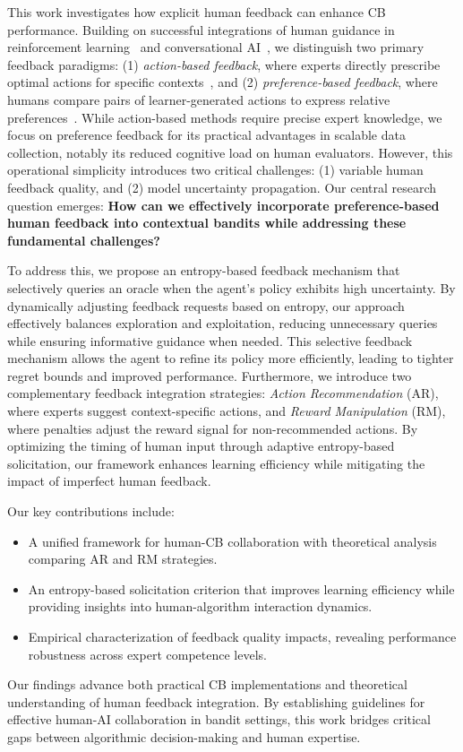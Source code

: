 This work investigates how explicit human feedback can enhance CB performance. Building on successful integrations of human guidance in reinforcement learning~\citep{christiano2017deep,macglashan2017interactive} and conversational AI~\citep{achiam2023gpt}, we distinguish two primary feedback paradigms: (1) \emph{action-based feedback}, where experts directly prescribe optimal actions for specific contexts~\citep{osa2018algorithmic,li2023reinforcement}, and (2) \emph{preference-based feedback}, where humans compare pairs of learner-generated actions to express relative preferences~\citep{christiano2017deep,saha2023dueling}. While action-based methods require precise expert knowledge, we focus on preference feedback for its practical advantages in scalable data collection, notably its reduced cognitive load on human evaluators. However, this operational simplicity introduces two critical challenges: (1) variable human feedback quality, and (2) model uncertainty propagation. Our central research question emerges: \textbf{How can we effectively incorporate preference-based human feedback into contextual bandits while addressing these fundamental challenges?}

To address this, we propose an entropy-based feedback mechanism that selectively queries an oracle when the agent’s policy exhibits high uncertainty. By dynamically adjusting feedback requests based on entropy, our approach effectively balances exploration and exploitation, reducing unnecessary queries while ensuring informative guidance when needed. This selective feedback mechanism allows the agent to refine its policy more efficiently, leading to tighter regret bounds and improved performance. Furthermore, we introduce two complementary feedback integration strategies: \textit{Action Recommendation} (AR), where experts suggest context-specific actions, and \textit{Reward Manipulation} (RM), where penalties adjust the reward signal for non-recommended actions. By optimizing the timing of human input through adaptive entropy-based solicitation, our framework enhances learning efficiency while mitigating the impact of imperfect human feedback.

Our key contributions include:

\begin{itemize}
\item A unified framework for human-CB collaboration with theoretical analysis comparing AR and RM strategies.

\item An entropy-based solicitation criterion that improves learning efficiency while providing insights into human-algorithm interaction dynamics.

\item Empirical characterization of feedback quality impacts, revealing performance robustness across expert competence levels.

\end{itemize}

Our findings advance both practical CB implementations and theoretical understanding of human feedback integration. By establishing guidelines for effective human-AI collaboration in bandit settings, this work bridges critical gaps between algorithmic decision-making and human expertise.
